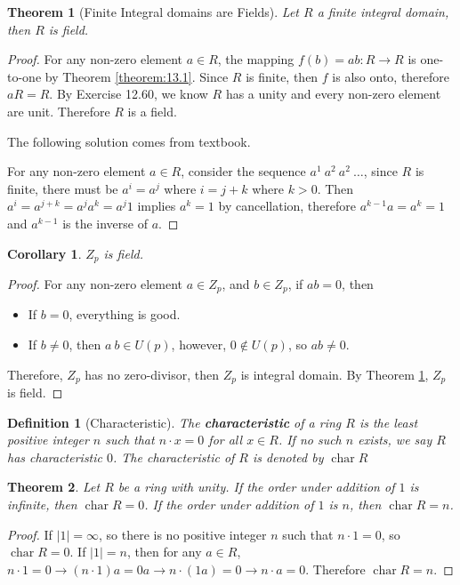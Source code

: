 \documentclass[14pt]{extarticle}
\newtheorem{theorem}{Theorem}[section]
\newtheorem{corollary}{Corollary}[section]
\newtheorem{definition}{Definition}[section]
\newcommand{\1}{\{e\}}
\DeclareMathOperator{\chara}{char}
\begin{document}
\begin{theorem}[Finite Integral domains are Fields]
  \label{theorem:13.2}
  Let $R$ a finite integral domain, then $R$ is field.
\end{theorem}
\begin{proof}
  For any non-zero element $a \in R$, the mapping $f(b) = ab : R \rightarrow R$
  is one-to-one by Theorem \ref{theorem:13.1}.
  Since $R$ is finite, then $f$ is also onto, therefore $aR = R$.
  By Exercise 12.60, we know $R$ has a unity and every non-zero element are unit.
  Therefore $R$ is a field.

  The following solution comes from textbook. \par
  For any non-zero element $a \in R$, consider the sequence $a^1 \ a^2 \ a^2 \ \dots$, 
  since $R$ is finite, there must be $a^i = a^j$ where $i = j + k$ where $k > 0$.
  Then $a^i = a^{j + k} = a^ja^k = a^j 1$ implies $a^k = 1$ by cancellation,
  therefore $a^{k - 1}a = a^k = 1$ and $a^{k - 1}$ is the inverse of $a$.
\end{proof}

\begin{corollary}
  $Z_p$ is field.
\end{corollary}
\begin{proof}
  For any non-zero element $a \in Z_p$, and $b \in Z_p$,
  if $ab = 0$, then
  \begin{itemize}
    \item If $b = 0$, everything is good.
    \item If $b \neq 0$, then $a \ b \in U(p)$, however, $0 \notin U(p)$, so $ab \neq 0$.
  \end{itemize}
  Therefore, $Z_p$ has no zero-divisor, then $Z_p$ is integral domain.
  By Theorem \ref{theorem:13.2}, $Z_p$ is field.
\end{proof}

\begin{definition}[Characteristic]
  The \textbf{characteristic} of a ring $R$ is the least positive integer $n$
  such that $n \cdot x = 0$ for all $x \in R$. If no such $n$ exists, 
  we say $R$ has characteristic $0$. The characteristic of $R$ is denoted by $\chara R$
\end{definition}

\begin{theorem}
  Let $R$ be a ring with unity. 
  If the order under addition of $1$ is infinite,
  then $\chara R = 0$.
  If the order under addition of $1$ is $n$,
  then $\chara R = n$.
\end{theorem}
\begin{proof}
  If $|1| = \infty$, so there is no positive integer $n$ such that $n \cdot 1 = 0$, so $\chara R = 0$.
  If $|1| = n$, then for any $a \in R$, $n \cdot 1 = 0 \rightarrow (n \cdot 1)a = 0a \rightarrow n \cdot (1a) = 0 \rightarrow n \cdot a = 0$.
  Therefore $\chara R = n$.
\end{proof}
\end{document}
